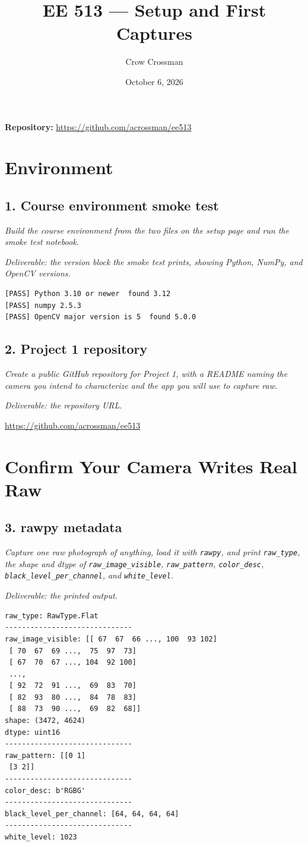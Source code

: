 \documentclass[11pt]{article}
\title{EE 513 --- Setup and First Captures}
\author{Crow Crossman}
\date{October 6, 2026}
\newcommand{\task}[3]{\subsection*{#1}{\sloppy\noindent\textit{#2}\par}\smallskip\noindent\textit{Deliverable: #3}\par\medskip}
\begin{document}
\maketitle

\noindent\textbf{Repository:} \url{https://github.com/acrossman/ee513}

\section*{Environment}

\task{1. Course environment smoke test}
{Build the course environment from the two files on the setup page and run the smoke test notebook.}
{the version block the smoke test prints, showing Python, NumPy, and OpenCV versions.}

\begin{lstlisting}
[PASS] Python 3.10 or newer  found 3.12
[PASS] numpy 2.5.3
[PASS] OpenCV major version is 5  found 5.0.0
\end{lstlisting}

\task{2. Project 1 repository}
{Create a public GitHub repository for Project 1, with a README naming the camera you intend to characterize and the app you will use to capture raw.}
{the repository URL.}

\url{https://github.com/acrossman/ee513}

\section*{Confirm Your Camera Writes Real Raw}

\task{3. rawpy metadata}
{Capture one raw photograph of anything, load it with \texttt{rawpy}, and print \texttt{raw\_type}, the shape and dtype of \texttt{raw\_image\_visible}, \texttt{raw\_pattern}, \texttt{color\_desc}, \texttt{black\_level\_per\_channel}, and \texttt{white\_level}.}
{the printed output.}

\begin{lstlisting}
raw_type: RawType.Flat
------------------------------
raw_image_visible: [[ 67  67  66 ..., 100  93 102]
 [ 70  67  69 ...,  75  97  73]
 [ 67  70  67 ..., 104  92 100]
 ..., 
 [ 92  72  91 ...,  69  83  70]
 [ 82  93  80 ...,  84  78  83]
 [ 88  73  90 ...,  69  82  68]]
shape: (3472, 4624)
dtype: uint16
------------------------------
raw_pattern: [[0 1]
 [3 2]]
------------------------------
color_desc: b'RGBG'
------------------------------
black_level_per_channel: [64, 64, 64, 64]
------------------------------
white_level: 1023
\end{lstlisting}
\end{document}
